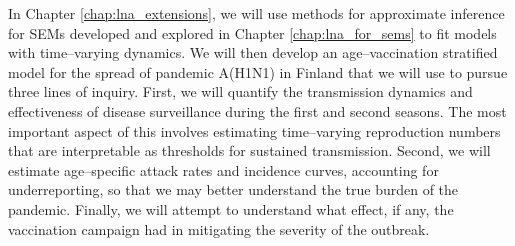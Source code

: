 In Chapter \ref{chap:lna_extensions}, we will use methods for approximate inference for SEMs developed and explored in Chapter \ref{chap:lna_for_sems} to fit models with time--varying dynamics. We will then develop an age--vaccination stratified model for the spread of pandemic A(H1N1) in Finland that we will use to pursue three lines of inquiry. First, we will quantify the transmission dynamics and effectiveness of disease surveillance during the first and second seasons. The most important aspect of this involves estimating time--varying reproduction numbers that are interpretable as thresholds for sustained transmission. Second, we will estimate age--specific attack rates and incidence curves, accounting for underreporting, so that we may better understand the true burden of the pandemic. Finally, we will attempt to understand what effect, if any, the vaccination campaign had in mitigating the severity of the outbreak.